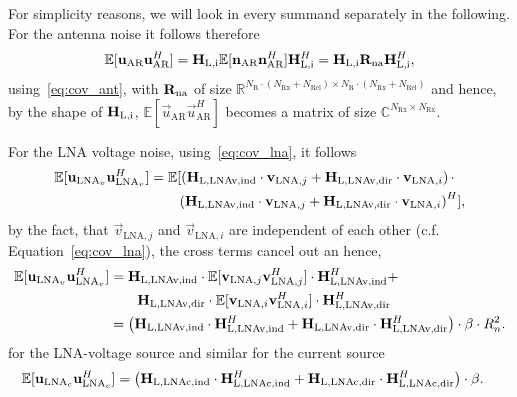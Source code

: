 For simplicity reasons, we will look in every summand separately in the following.
For the antenna noise it follows therefore
\begin{align}
\mathbb{E}[\mathbf{u}_\text{AR}\mathbf{u}_\text{AR}^H] = 
	\mathbf{H}_\text{L,i}\mathbb{E}[\mathbf{n}_\text{AR}\mathbf{n}_\text{AR}^H]\mathbf{H}_\text{L,i}^H 
	= \mathbf{H}_\text{L,i} \mathbf{R}_\text{na} \mathbf{H}_\text{L,i}^H,
\end{align}
using~\eqref{eq:cov_ant}, with $\mathbf{R}_\text{na}$ of size $\mathbb{R}^{ N_\text{R}\cdot\left(N_\text{Rx}+N_\text{Rel}\right)\times N_\text{R}\cdot\left(N_\text{Rx}+N_\text{Rel}\right)}$ and hence, by the shape of $\mathbf{H}_\text{L,i}$, $\mathbb{E}[\vec{u}_\text{AR}\vec{u}_\text{AR}^H]$ becomes a matrix of size $\mathbb{C}^{ N_\text{Rx}\times N_\text{Rx}}$.


For the LNA voltage noise, using~\eqref{eq:cov_lna}, it follows
\begin{align}
\nonumber
\mathbb{E}[\mathbf{u}_{\text{LNA}_v}\mathbf{u}_{\text{LNA}_v}^H] &= 
\mathbb{E}[\left(\mathbf{H}_\text{L,LNAv,ind}\cdot\mathbf{v}_{\text{LNA},j}+\mathbf{H}_\text{L,LNAv,dir}\cdot\mathbf{v}_{\text{LNA},i}\right)\cdot\\
&\qquad\left(\mathbf{H}_\text{L,LNAv,ind}\cdot\mathbf{v}_{\text{LNA},j}+\mathbf{H}_\text{L,LNAv,dir}\cdot\mathbf{v}_{\text{LNA},i}\right)^H],
\end{align}
by the fact, that $\vec{v}_{\text{LNA},j}$ and $\vec{v}_{\text{LNA},i}$ are independent of each other (c.f. Equation~\eqref{eq:cov_lna}), the cross terms cancel out an hence,
\begin{align}
\nonumber
\mathbb{E}[\mathbf{u}_{\text{LNA}_v}\mathbf{u}_{\text{LNA}_v}^H]&=
	\mathbf{H}_\text{L,LNAv,ind}\cdot
	\mathbb{E}[\mathbf{v}_{\text{LNA},j}\mathbf{v}_{\text{LNA},j}^H]\cdot
	\mathbf{H}_\text{L,LNAv,ind}^H+\\\nonumber
&\qquad \mathbf{H}_\text{L,LNAv,dir}\cdot
	\mathbb{E}[\mathbf{v}_{\text{LNA},i}\mathbf{v}_{\text{LNA},i}^H]\cdot
	\mathbf{H}_\text{L,LNAv,dir}^H\\
&=\left(\mathbf{H}_\text{L,LNAv,ind}\cdot\mathbf{H}_\text{L,LNAv,ind}^H+
	\mathbf{H}_\text{L,LNAv,dir}\cdot\mathbf{H}_\text{L,LNAv,dir}^H\right)\cdot \beta \cdot R_n^2.
\end{align}
for the LNA-voltage source and similar for the current source
\begin{align}
\mathbb{E}[\mathbf{u}_{\text{LNA}_c}\mathbf{u}_{\text{LNA}_c}^H]&= 
\left(\mathbf{H}_\text{L,LNAc,ind}\cdot\mathbf{H}_\text{L,LNAc,ind}^H+
	\mathbf{H}_\text{L,LNAc,dir}\cdot\mathbf{H}_\text{L,LNAc,dir}^H\right)\cdot \beta.
\end{align}

